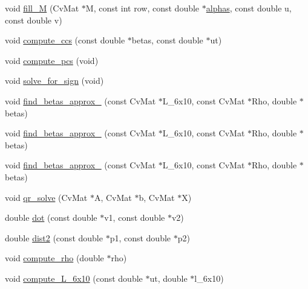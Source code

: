 \begin{DoxyCompactItemize}
\item 
void \mbox{\hyperlink{class_o_r_b___s_l_a_m2_1_1_pn_psolver_a8cc37bbb1cc4e575d83fb7503136a542}{fill\+\_\+M}} (Cv\+Mat $\ast$M, const int row, const double $\ast$\mbox{\hyperlink{class_o_r_b___s_l_a_m2_1_1_pn_psolver_a868ef3e00710a5541d50a15af7be2a20}{alphas}}, const double u, const double v)
\item 
void \mbox{\hyperlink{class_o_r_b___s_l_a_m2_1_1_pn_psolver_ac4c58e214a0016e1e58cbc1afd9eb5eb}{compute\+\_\+ccs}} (const double $\ast$betas, const double $\ast$ut)
\item 
void \mbox{\hyperlink{class_o_r_b___s_l_a_m2_1_1_pn_psolver_abeb37c568bb09293bb679d84bb4d2796}{compute\+\_\+pcs}} (void)
\item 
void \mbox{\hyperlink{class_o_r_b___s_l_a_m2_1_1_pn_psolver_af33413cd4dc6f3e963cf49997baa40c2}{solve\+\_\+for\+\_\+sign}} (void)
\item 
void \mbox{\hyperlink{class_o_r_b___s_l_a_m2_1_1_pn_psolver_a6d36f0e15dfca9c0ecfff91149882232}{find\+\_\+betas\+\_\+approx\+\_}} (const Cv\+Mat $\ast$L\+\_\+6x10, const Cv\+Mat $\ast$Rho, double $\ast$betas)
\item 
void \mbox{\hyperlink{class_o_r_b___s_l_a_m2_1_1_pn_psolver_a95d7f0790ebd99fdc012971dd9a78e65}{find\+\_\+betas\+\_\+approx\+\_}} (const Cv\+Mat $\ast$L\+\_\+6x10, const Cv\+Mat $\ast$Rho, double $\ast$betas)
\item 
void \mbox{\hyperlink{class_o_r_b___s_l_a_m2_1_1_pn_psolver_af80a1580251b4368156fb0e0d36a7ac2}{find\+\_\+betas\+\_\+approx\+\_}} (const Cv\+Mat $\ast$L\+\_\+6x10, const Cv\+Mat $\ast$Rho, double $\ast$betas)
\item 
void \mbox{\hyperlink{class_o_r_b___s_l_a_m2_1_1_pn_psolver_ac9290df9524ca70b3127ea3408fb7b0d}{qr\+\_\+solve}} (Cv\+Mat $\ast$A, Cv\+Mat $\ast$b, Cv\+Mat $\ast$X)
\item 
double \mbox{\hyperlink{class_o_r_b___s_l_a_m2_1_1_pn_psolver_afd58911fc21c6255ac5c541b8e4540ac}{dot}} (const double $\ast$v1, const double $\ast$v2)
\item 
double \mbox{\hyperlink{class_o_r_b___s_l_a_m2_1_1_pn_psolver_af117c07b4d7b9b5990f98f33d19482d3}{dist2}} (const double $\ast$p1, const double $\ast$p2)
\item 
void \mbox{\hyperlink{class_o_r_b___s_l_a_m2_1_1_pn_psolver_af2f8ccb85a3c8341efae307892caad37}{compute\+\_\+rho}} (double $\ast$rho)
\item 
void \mbox{\hyperlink{class_o_r_b___s_l_a_m2_1_1_pn_psolver_add2118dab6bee4303e80c0ca109f3b2c}{compute\+\_\+\+L\+\_\+6x10}} (const double $\ast$ut, double $\ast$l\+\_\+6x10)

\end{DoxyCompactItemize}
